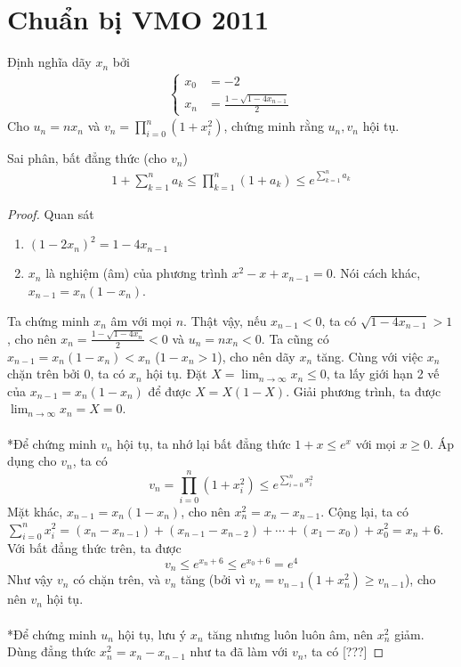 \documentclass{treatise}
\begin{document}
\section{Chuẩn bị VMO 2011}
\begin{exercise}
Định nghĩa dãy $x_n$ bởi
\begin{align*}
\begin{cases}
x_0 & = -2 \\
x_n & = \frac{1 - \sqrt{1 - 4 x_{n - 1}}}{2}
\end{cases}
\end{align*}
Cho $u_n = n x_n$ và $v_n = \prod_{i = 0}^n (1 + x_i^2)$, chứng minh rằng $u_n, v_n$ hội tụ.
\end{exercise}
\begin{remark}
Sai phân, bất đẳng thức (cho $v_n$)
\begin{align*}
1 + \sum_{k = 1}^n a_k \leq \prod_{k = 1}^n (1 + a_k) \leq e^{\sum_{k = 1}^n a_k}
\end{align*}
\end{remark}
\begin{proof}
Quan sát
\begin{enumerate}
	\item $\left( 1 - 2x_n \right)^2 = 1 - 4 x_{n - 1}$
	\item $x_n$ là nghiệm (âm) của phương trình $x^2 - x + x_{n - 1} = 0$. Nói cách khác, $x_{n - 1} = x_n (1 - x_n)$.
\end{enumerate}
Ta chứng minh $x_n$ âm với mọi $n$. Thật vậy, nếu $x_{n - 1} < 0$, ta có $\sqrt{1 - 4x_{n - 1}} > 1$, cho nên $x_n = \frac{1 - \sqrt{1 - 4x_n}}{2} < 0$ và $u_n = n x_n < 0$. Ta cũng có $x_{n - 1} = x_n (1 - x_n) < x_n$ ($1 - x_n > 1$), cho nên dãy $x_n$ tăng. Cùng với việc $x_n$ chặn trên bởi $0$, ta có $x_n$ hội tụ. Đặt $X = \lim_{n \to \infty} x_n \leq 0$, ta lấy giới hạn 2 vế của $x_{n - 1} = x_n (1 - x_n)$ để được $X = X (1 - X)$. Giải phương trình, ta được $\lim_{n \to \infty} x_n = X = 0$.
\\
\\
*Để chứng minh $v_n$ hội tụ, ta nhớ lại bất đẳng thức $1 + x \leq e^x$ với mọi $x \geq 0$. Áp dụng cho $v_n$, ta có
$$v_n = \prod_{i = 0}^n (1 + x_i^2) \leq e^{\sum_{i = 0}^n x_i^2}$$
Mặt khác, $x_{n - 1} = x_n (1 - x_n)$, cho nên $x_n^2 = x_n - x_{n - 1}$. Cộng lại, ta có $\sum_{i = 0}^n x_i^2 = (x_n - x_{n - 1}) + (x_{n - 1} - x_{n - 2}) + \cdots + (x_1 - x_0) + x_0^2 = x_n + 6$. Với bất đẳng thức trên, ta được
$$v_n \leq e^{x_n + 6} \leq e^{x_0 + 6} = e^4$$
Như vậy $v_n$ có chặn trên, và $v_n$ tăng (bởi vì $v_n = v_{n - 1} (1 + x_n^2) \geq v_{n - 1}$), cho nên $v_n$ hội tụ.
\\
\\
*Để chứng minh $u_n$ hội tụ, lưu ý $x_n$ tăng nhưng luôn luôn âm, nên $x_n^2$ giảm. Dùng đẳng thức $x_n^2 = x_n - x_{n - 1}$ như ta đã làm với $v_n$, ta có [???]
\end{proof}
\end{document}
